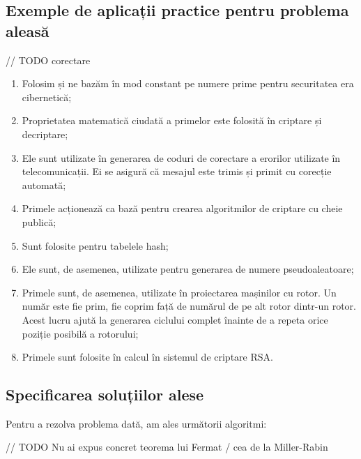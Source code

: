 \documentclass[runningheads]{llncs}
\begin{document}
\subsection{Exemple de aplicații practice pentru problema aleasă}

// TODO corectare

\begin{enumerate}
    \item Folosim și ne bazăm în mod constant pe numere prime pentru securitatea era cibernetică;
    \item Proprietatea matematică ciudată a primelor este folosită în criptare și decriptare;
    \item Ele sunt utilizate în generarea de coduri de corectare a erorilor utilizate în telecomunicații. Ei se asigură că mesajul este trimis și primit cu corecție automată;
    \item Primele acționează ca bază pentru crearea algoritmilor de criptare cu cheie publică;
    \item Sunt folosite pentru tabelele hash;
    \item Ele sunt, de asemenea, utilizate pentru generarea de numere pseudoaleatoare;
    \item Primele sunt, de asemenea, utilizate în proiectarea mașinilor cu rotor. Un număr este fie prim, fie coprim față de numărul de pe alt rotor dintr-un rotor. Acest lucru ajută la generarea ciclului complet înainte de a repeta orice poziție posibilă a rotorului;
    \item Primele sunt folosite în calcul în sistemul de criptare RSA.
\end{enumerate}

\subsection{Specificarea soluțiilor alese}

Pentru a rezolva problema dată, am ales următorii algoritmi:

// TODO Nu ai expus concret teorema lui Fermat / cea de la Miller-Rabin
\end{document}
